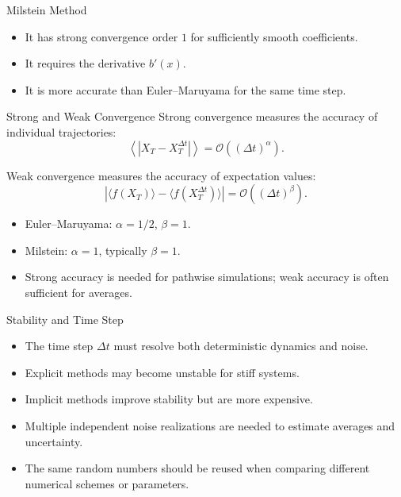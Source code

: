 \documentclass[a4paper, 10pt, onepage]{elegantbook}
\begin{document}
{\begin{frame}{Milstein Method}
  \begin{itemize}
    \item It has strong convergence order \(1\) for sufficiently smooth coefficients.
    \item It requires the derivative \(b'(x)\).
    \item It is more accurate than Euler--Maruyama for the same time step.
  \end{itemize}
\end{frame}

\begin{frame}{Strong and Weak Convergence}
  Strong convergence measures the accuracy of individual trajectories:
  \[
    \left\langle
      |X_T-X_T^{\Delta t}|
    \right\rangle
    =
    \mathcal{O}\left((\Delta t)^\alpha\right).
  \]

  Weak convergence measures the accuracy of expectation values:
  \[
    \left|
      \langle f(X_T)\rangle
      -
      \langle f(X_T^{\Delta t})\rangle
    \right|
    =
    \mathcal{O}\left((\Delta t)^\beta\right).
  \]

  \begin{itemize}
    \item Euler--Maruyama: \(\alpha=1/2\), \(\beta=1\).
    \item Milstein: \(\alpha=1\), typically \(\beta=1\).
    \item Strong accuracy is needed for pathwise simulations; weak accuracy is often sufficient for averages.
  \end{itemize}
\end{frame}

\begin{frame}{Stability and Time Step}
  \begin{itemize}
    \item The time step \(\Delta t\) must resolve both deterministic dynamics and noise.
    \item Explicit methods may become unstable for stiff systems.
    \item Implicit methods improve stability but are more expensive.
    \item Multiple independent noise realizations are needed to estimate averages and uncertainty.
    \item The same random numbers should be reused when comparing different numerical schemes or parameters.
  \end{itemize}
\end{frame}

}
\end{document}
